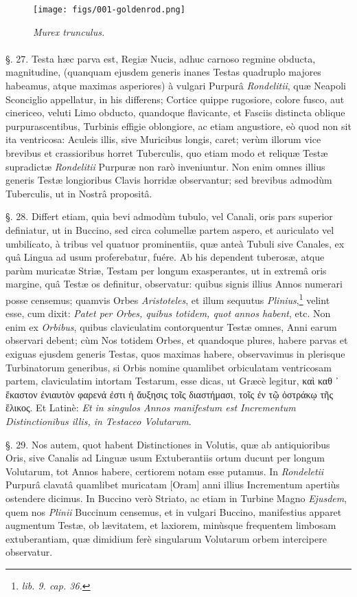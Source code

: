 \documentclass[a4paper, 11pt, oneside, polutonikogreek, german]{article}
\begin{document}
\begin{figure}[H]
\centering
\texttt{[image: figs/001-goldenrod.png]}
\caption{\emph{Murex trunculus.}}
\end{figure}
\paragraph{}
§. 27. Testa hæc parva est, Regiæ Nucis, adhuc carnoso regmine obducta, magnitudine, (quanquam ejusdem generis inanes Testas quadruplo majores habeamus, atque maximas asperiores) à vulgari Purpurâ \emph{Rondelitii}, quæ Neapoli Sconciglio appellatur, in his differens; Cortice quippe rugosiore, colore fusco, aut cinericeo, veluti Limo obducto, quandoque flavicante, et Fasciis distincta oblique purpurascentibus, Turbinis effigie oblongiore, ac etiam angustiore, eò quod non sit ita ventricosa: Aculeis illis, sive Muricibus longis, caret; verùm illorum vice brevibus et crassioribus horret Tuberculis, quo etiam modo et reliquæ Testæ supradictæ \emph{Rondelitii} Purpuræ non rarò inveniuntur. Non enim omnes illius generis Testæ longioribus Clavis horridæ observantur; sed brevibus admodùm Tuberculis, ut in Nostrâ propositâ.

§. 28. Differt etiam, quia bevi admodùm tubulo, vel Canali, oris pars superior definiatur, ut in Buccino, sed circa columellæ partem aspero, et auriculato vel umbilicato, à tribus vel quatuor prominentiis, quæ anteà Tubuli sive Canales, ex quâ Lingua ad usum proferebatur, fuére. Ab his dependent tuberosæ, atque parùm muricatæ Striæ, Testam per longum exasperantes, ut in extremâ oris margine, quâ Testæ os definitur, observatur: quibus signis illius Annos numerari posse censemus; quamvis Orbes \emph{Aristoteles}, et illum sequutus \emph{Plinius},\footnote{\emph{lib. 9. cap. 36.}} velint esse, cum dixit: \emph{Patet per Orbes, quibus totidem, quot annos habent}, etc. Non enim ex \emph{Orbibus}, quibus claviculatim contorquentur Testæ omnes, Anni earum observari debent; cùm Nos totidem Orbes, et quandoque plures, habere parvas et exiguas ejusdem generis Testas, quos maximas habere, observavimus in plerisque Turbinatorum generibus, si Orbis nomine quamlibet orbiculatam ventricosam partem, claviculatim intortam Testarum, esse dicas, ut Græcè legitur, καὶ καθ ᾽ ἕκαστον ἐνιαυτὸν φαρενά ἐστι ἡ ἄυξησις τοῖς διαστήμασι, τοῖς ἐν τῷ ὀστράκῳ τῆς ἕλικος. Et Latinè: \emph{Et in singulos Annos manifestum est Incrementum Distinctionibus illis, in Testaceo Volutarum}.

§. 29. Nos autem, quot habent Distinctiones in Volutis, quæ ab antiquioribus Oris, sive Canalis ad Linguæ usum Extuberantiis ortum ducunt per longum Volutarum, tot Annos habere, certiorem notam esse putamus. In \emph{Rondeletii} Purpurâ clavatâ quamlibet muricatam [Oram] anni illius Incrementum apertiùs ostendere dicimus. In Buccino verò Striato, ac etiam in Turbine Magno \emph{Ejusdem}, quem nos \emph{Plinii} Buccinum censemus, et in vulgari Buccino, manifestius apparet augmentum Testæ, ob lævitatem, et laxiorem, minùsque frequentem limbosam extuberantiam, quæ dimidium ferè singularum Volutarum orbem intercipere observatur.
\end{document}
